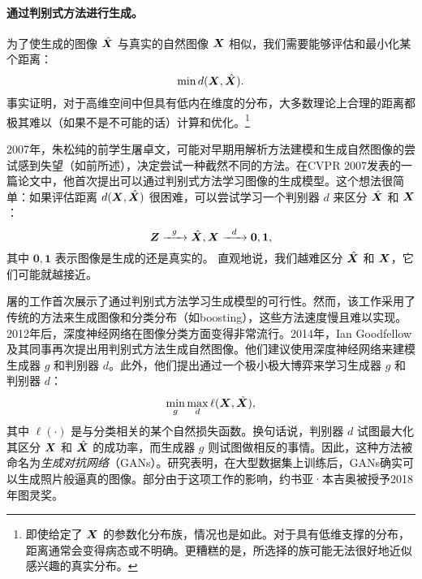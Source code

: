 \documentclass[../../book-main.tex]{subfiles}
\begin{document}
\paragraph{通过判别式方法进行生成。}
为了使生成的图像 $\hat {\bm{X}}$ 与真实的自然图像 $\bm{X}$ 相似，我们需要能够评估和最小化某个距离：
\begin{equation}
    \min d(\bm{X}, \hat {\bm{X}}).
\end{equation}
事实证明，对于高维空间中但具有低内在维度的分布，大多数理论上合理的距离都极其难以（如果不是不可能的话）计算和优化。\footnote{即使给定了 $\bm{X}$ 的参数化分布族，情况也是如此。对于具有低维支撑的分布，距离通常会变得病态或不明确。更糟糕的是，所选择的族可能无法很好地近似感兴趣的真实分布。}

2007年，朱松纯的前学生屠卓文，可能对早期用解析方法建模和生成自然图像的尝试感到失望（如前所述），决定尝试一种截然不同的方法。在CVPR 2007发表的一篇论文中\cite{Tu-2007}，他首次提出可以通过判别式方法学习图像的生成模型。这个想法很简单：如果评估距离 $d(\bm{X}, \hat {\bm{X}})$ 很困难，可以尝试学习一个判别器 $d$ 来区分 $\hat {\bm{X}}$ 和 $\bm{X}$：
\begin{equation}
    \bm{Z}   \xrightarrow{\hspace{2mm} g  \hspace{2mm}} \hat {\bm{X}}, \bm{X} \xrightarrow{\hspace{2mm} d  \hspace{2mm}} \boldsymbol{0}, \boldsymbol{1},
       \label{eqn:gan-networks}
\end{equation}
其中 $\boldsymbol{0}, \boldsymbol{1}$ 表示图像是生成的还是真实的。
直观地说，我们越难区分 $\hat {\bm{X}}$ 和 $\bm{X}$，它们可能就越接近。

屠的工作\cite{Tu-2007}首次展示了通过判别式方法学习生成模型的可行性。然而，该工作采用了传统的方法来生成图像和分类分布（如boosting），这些方法速度慢且难以实现。2012年后，深度神经网络在图像分类方面变得非常流行。2014年，Ian Goodfellow及其同事再次提出用判别式方法生成自然图像\cite{Goodfellow-2014}。他们建议使用深度神经网络来建模生成器 $g$ 和判别器 $d$。此外，他们提出通过一个极小极大博弈来学习生成器 $g$ 和判别器 $d$：
\begin{equation}
    \min_g \max_d \ell(\bm{X}, \hat {\bm{X}}),
\end{equation}
其中 $\ell(\cdot)$ 是与分类相关的某个自然损失函数。换句话说，判别器 $d$ 试图最大化其区分 $\bm{X}$ 和 $\hat {\bm{X}}$ 的成功率，而生成器 $g$ 则试图做相反的事情。因此，这种方法被命名为{\em 生成对抗网络}（GANs）。研究表明，在大型数据集上训练后，GANs确实可以生成照片般逼真的图像。部分由于这项工作的影响，约书亚·本吉奥被授予2018年图灵奖。
\end{document}
